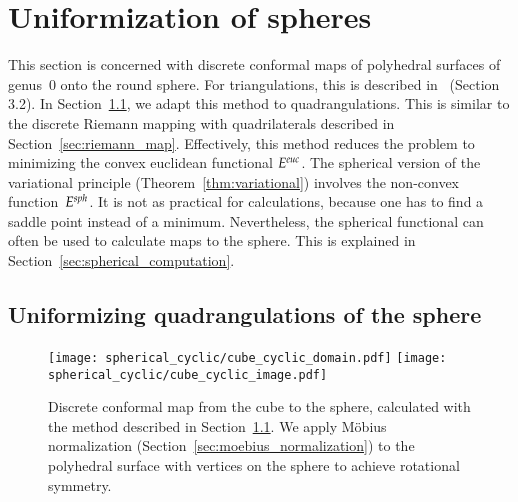 \documentclass[Thesis]{subfiles}
\begin{document}
\section{Uniformization of spheres}
\label{sec:spheres}

This section is concerned with discrete conformal maps of polyhedral
surfaces of genus~$0$ onto the round sphere. For triangulations, this
is described in~\cite{BPS2015:dconf} (Section 3.2). In
Section~\ref{sec:spheres_euclidean}, we adapt this method to
quadrangulations. This is similar to the discrete Riemann mapping with
quadrilaterals described in
Section~\ref{sec:riemann_map}. Effectively, this method reduces the
problem to minimizing the convex euclidean functional $E^{\euc}$. The
spherical version of the variational principle
(Theorem~\ref{thm:variational}) involves the non-convex
function~$E^{\mathit{sph}}$. It is not as practical for calculations, because
one has to find a saddle point instead of a minimum. Nevertheless, the
spherical functional can often be used to calculate maps to the
sphere. This is explained in Section~\ref{sec:spherical_computation}.

\subsection{Uniformizing quadrangulations of the sphere}
\label{sec:spheres_euclidean}

\begin{figure}
\centering%
\texttt{[image: spherical\_cyclic/cube\_cyclic\_domain.pdf]}%
\hspace{0.1\textwidth}%
\texttt{[image: spherical\_cyclic/cube\_cyclic\_image.pdf]}%
\caption{Discrete conformal map from the cube to the sphere,
  calculated with the method described in
  Section~\ref{sec:spheres_euclidean}. We apply M{\"o}bius
  normalization (Section~\ref{sec:moebius_normalization}) to the
  polyhedral surface with vertices on the sphere to achieve rotational
  symmetry.}
\label{fig:spherical_circular}
\end{figure}
\end{document}
